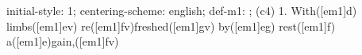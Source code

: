 initial-style: 1;
centering-scheme: english;
def-m1: \grealign;
(c4) 1. With([em1]d) limbs([em1]ev) re([em1]fv)freshed([em1]gv) by([em1]eg) rest([em1]f) a([em1]e)gain,([em1]fv)